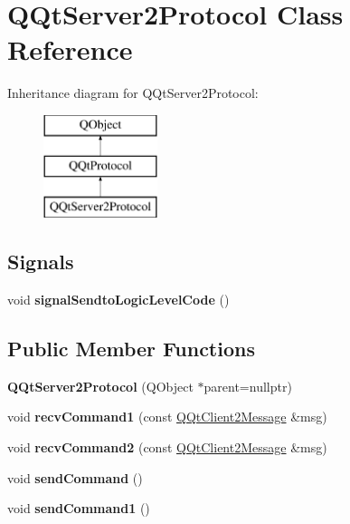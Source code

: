 \hypertarget{class_q_qt_server2_protocol}{}\section{Q\+Qt\+Server2\+Protocol Class Reference}
\label{class_q_qt_server2_protocol}
Inheritance diagram for Q\+Qt\+Server2\+Protocol\+:\begin{figure}[H]
\begin{center}
\leavevmode
\includegraphics[height=3.000000cm]{class_q_qt_server2_protocol}
\end{center}
\end{figure}
\subsection*{Signals}
\begin{DoxyCompactItemize}
\item 
\mbox{\label{class_q_qt_server2_protocol_a6e458fbdddcafaa00bd429dc88e195d4}} 
void {\bfseries signal\+Sendto\+Logic\+Level\+Code} ()
\end{DoxyCompactItemize}
\subsection*{Public Member Functions}
\begin{DoxyCompactItemize}
\item 
\mbox{\label{class_q_qt_server2_protocol_a20ed5223b1d9e62461a14fd9e7064b43}} 
{\bfseries Q\+Qt\+Server2\+Protocol} (Q\+Object $\ast$parent=nullptr)
\item 
\mbox{\label{class_q_qt_server2_protocol_aa7e6a77b69046ff9bbd995c18bff1c20}} 
void {\bfseries recv\+Command1} (const \mbox{\hyperlink{class_q_qt_client2_message}{Q\+Qt\+Client2\+Message}} \&msg)
\item 
\mbox{\label{class_q_qt_server2_protocol_a28e47b6b48a955eaea0cf4f8b05c1216}} 
void {\bfseries recv\+Command2} (const \mbox{\hyperlink{class_q_qt_client2_message}{Q\+Qt\+Client2\+Message}} \&msg)
\item 
\mbox{\label{class_q_qt_server2_protocol_ab51580a0cd061458d5149991d9b6d0a7}} 
void {\bfseries send\+Command} ()
\item 
\mbox{\label{class_q_qt_server2_protocol_ab16f85f73b7b40b93fd7e5a1f1142f88}} 
void {\bfseries send\+Command1} ()
\end{DoxyCompactItemize}
